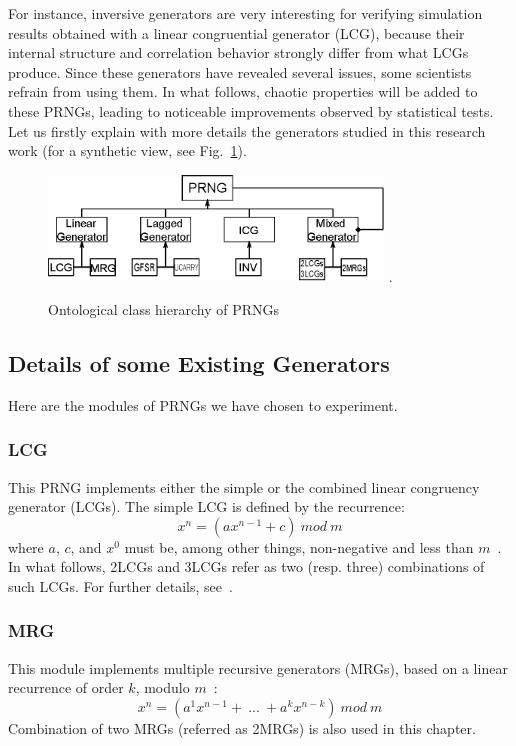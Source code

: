 For instance, inversive generators are very interesting for verifying simulation results obtained with a linear congruential generator (LCG),
because their internal structure and correlation behavior strongly differ from what LCGs produce.
Since these generators have revealed several issues, some scientists refrain from using them.
In what follows, chaotic properties will be added to these PRNGs, leading to noticeable improvements observed by statistical tests.
Let us firstly explain with more details the generators studied in this research work (for a synthetic view, see Fig.~\ref{Ontological class hierarchy of RNGs}).

\begin{figure}
\centering
\includegraphics[width=3.5in]{TYPEPRNG.eps}
\DeclareGraphicsExtensions.
\caption{Ontological class hierarchy of PRNGs}
\label{Ontological class hierarchy of RNGs}
\end{figure}

\subsection{Details of some Existing Generators}

Here are the modules of PRNGs we have chosen to experiment.

\subsubsection{LCG}
This PRNG implements either the simple or the combined linear congruency generator (LCGs). The simple LCG is defined by the recurrence:
\begin{equation}
x^n = (ax^{n-1} + c)~mod~m
\label{LCG}
\end{equation}
where $a$, $c$, and $x^0$ must be, among other things, non-negative and less than $m$~\cite{Lecuyer2009}. In what follows, 2LCGs and 3LCGs refer as two (resp. three) combinations of such LCGs.
For further details, see~\cite{combined_lcg}.

\subsubsection{MRG}
This module implements multiple recursive generators (MRGs), based on a linear recurrence of order $k$, modulo $m$~\cite{Lecuyer2009}:
\begin{equation}
x^n = (a^1x^{n-1}+~...~+a^kx^{n-k})~mod~m
\label{MRG}
\end{equation}
Combination of two MRGs (referred as 2MRGs) is also used in this chapter.

